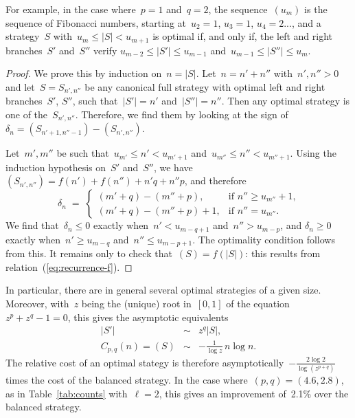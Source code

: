 \documentclass[jmc]{degruyter-journal-a}
\theoremstyle{definition}
\def\abs#1{\left|#1\right|}
\begin{document}
For example, in the case where~$p = 1$ and~$q = 2$, the sequence~$(u_m)$
is the sequence of Fibonacci numbers, starting at~$u_2 = 1$, $u_3 = 1$,
$u_4 = 2$..., and a strategy~$S$ with~$u_{m} \leq \abs{S} < u_{m+1}$ is
optimal if, and only if, the left and right branches~$S'$ and~$S''$
verify $u_{m-2} \leq \abs{S'} \leq u_{m-1}$ and~$u_{m-1} \leq \abs{S''} \leq
u_m$.

\begin{proof}
We prove this by induction on~$n = \abs{S}$. Let~$n = n' + n''$ with~$n',
n'' > 0$ and let~$S = S_{n',n''}$ be any canonical full strategy with optimal
left and right branches~$S'$, $S''$, such that~$\abs{S'} = n'$
and~$\abs{S''} = n''$. Then any optimal strategy is one of
the~$S_{n',n''}$. Therefore, we find them by looking at the sign
of~$\delta_n = (S_{n'+1,n''-1}) - (S_{n',n''})$.

Let~$m',m''$ be such that~$u_{m'} \leq n' < u_{m' + 1}$ and~$u_{m''} \leq
n'' < u_{m''+1}$. Using the induction hypothesis on~$S'$ and~$S''$, we
have $(S_{n',n''}) = f(n') + f(n'')  + n' q + n'' p$, and therefore
\begin{equation}
\delta_n \;=\; \begin{cases}
(m' + q) - (m'' + p),& \text{if $n'' \geq u_{m''} + 1$,}\\
(m' + q) - (m'' + p) + 1, &\text{if $n'' = u_{m''}$.}
\end{cases}
\end{equation}
We find that~$\delta_n \leq 0$ exactly when~$n' < u_{m-q+1}$ and~$n'' >
u_{m-p}$, and $\delta_n \geq 0$ exactly when~$n' \geq u_{m-q}$ and~$n''
\leq u_{m-p+1}$. The optimality condition follows from this.
It remains only to check that~$(S) = f(\abs{S})$: this results from
relation~(\ref{eq:recurrence-f}).
\end{proof}

In particular, there are in general several optimal strategies of a given
size. Moreover, with~$z$ being the (unique) root in~$[0,1]$ of the
equation~$z^p + z^q - 1 = 0$, this gives the asymptotic equivalents
\begin{eqnarray}
\abs{S'} &\sim& z^q \abs{S},\\
C_{p,q}(n) = (S) &\sim& -\frac{1}{\log z}\, n \log n.
\end{eqnarray}
The relative cost of an optimal stategy is therefore
asymptotically~$-\frac{2 \log 2}{\log (z^{p+q})}$ times the cost of
the balanced strategy. In the case where~$(p, q) = (4.6, 2.8)$, as in
Table~\ref{tab:counts} with~$\ell = 2$, this gives an improvement
of~2.1\% over the balanced strategy.
\end{document}
